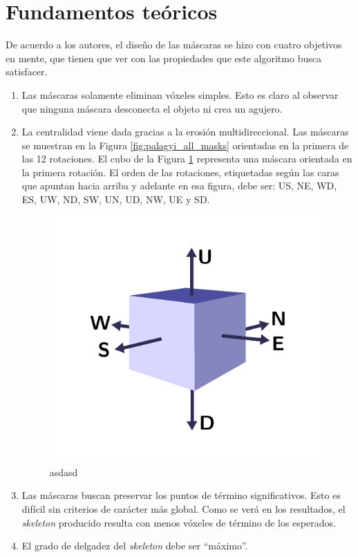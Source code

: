 \section{Fundamentos teóricos}

De acuerdo a los autores, el diseño de las máscaras se hizo con cuatro objetivos en mente, que tienen que ver con las propiedades que este algoritmo busca satisfacer.

\begin{enumerate}
\item Las máscaras solamente eliminan vóxeles simples. Esto es claro al observar que ninguna máscara desconecta el objeto ni crea un agujero.
\item La centralidad viene dada gracias a la erosión multidireccional. Las máscaras se muestran en la Figura \ref{fig:palagyi_all_masks} orientadas en la primera de las 12 rotaciones. El cubo de la Figura \ref{fig:palagyi_orientations} representa una máscara orientada en la primera rotación. El orden de las rotaciones, etiquetadas según las caras que apuntan hacia arriba y adelante en esa figura, debe ser: US, NE, WD, ES, UW, ND, SW, UN, UD, NW, UE y SD.

\begin{figure}[H]\centering
\includegraphics[width=0.5\linewidth]{images/palagyi_orientations}
\caption{asdasd}
\label{fig:palagyi_orientations}
\end{figure}

\item Las máscaras buscan preservar los puntos de término significativos. Esto es difícil sin criterios de carácter más global. Como se verá en los resultados, el \textit{skeleton} producido resulta con menos vóxeles de término de los esperados.

\item El grado de delgadez del \textit{skeleton} debe ser ``máximo''.

\end{enumerate}


